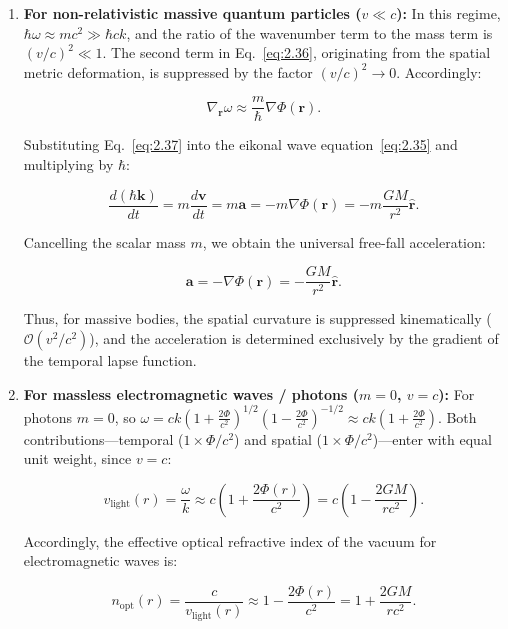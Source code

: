 \documentclass[11pt,a4paper]{article}
\theoremstyle{definition}
\begin{document}
\begin{enumerate}
\item \textbf{For non-relativistic massive quantum particles ($v \ll c$):}  
In this regime, $\hbar \omega \approx m c^2 \gg \hbar c k$, and the ratio of the wavenumber term to the mass term is $(v/c)^2 \ll 1$. The second term in Eq.~\eqref{eq:2.36}, originating from the spatial metric deformation, is suppressed by the factor $(v/c)^2 \to 0$. Accordingly:

\begin{equation}\label{eq:2.37}\tag{2.37}
\nabla_{\mathbf{r}}\omega \approx \frac{m}{\hbar} \nabla\Phi(\mathbf{r}).
\end{equation}

Substituting Eq.~\eqref{eq:2.37} into the eikonal wave equation~\eqref{eq:2.35} and multiplying by $\hbar$:

\begin{equation}\label{eq:2.38}\tag{2.38}
\frac{d(\hbar \mathbf{k})}{dt} = m \frac{d\mathbf{v}}{dt} = m \mathbf{a} = -m \nabla \Phi(\mathbf{r}) = -m \frac{GM}{r^2}\hat{\mathbf{r}}.
\end{equation}

Cancelling the scalar mass $m$, we obtain the universal free-fall acceleration:

\begin{equation}\label{eq:2.39}\tag{2.39}
\mathbf{a} = -\nabla\Phi(\mathbf{r}) = -\frac{GM}{r^2} \hat{\mathbf{r}}.
\end{equation}

Thus, for massive bodies, the spatial curvature is suppressed kinematically ($\mathcal{O}(v^2/c^2)$), and the acceleration is determined exclusively by the gradient of the temporal lapse function.

\item \textbf{For massless electromagnetic waves / photons ($m = 0$, $v = c$):}  
For photons $m = 0$, so $\omega = c k \left(1 + \frac{2\Phi}{c^2}\right)^{1/2}\left(1 - \frac{2\Phi}{c^2}\right)^{-1/2} \approx c k \left(1 + \frac{2\Phi}{c^2}\right)$. Both contributions---temporal ($1 \times \Phi/c^2$) and spatial ($1 \times \Phi/c^2$)---enter with equal unit weight, since $v = c$:

\begin{equation}\label{eq:2.40}\tag{2.40}
v_{\text{light}}(r) = \frac{\omega}{k} \approx c \left( 1 + \frac{2\Phi(r)}{c^2} \right) = c \left( 1 - \frac{2GM}{r c^2} \right).
\end{equation}

Accordingly, the effective optical refractive index of the vacuum for electromagnetic waves is:

\begin{equation}\label{eq:2.41}\tag{2.41}
n_{\text{opt}}(r) = \frac{c}{v_{\text{light}}(r)} \approx 1 - \frac{2\Phi(r)}{c^2} = 1 + \frac{2GM}{r c^2}.
\end{equation}
\end{enumerate}
\end{document}
